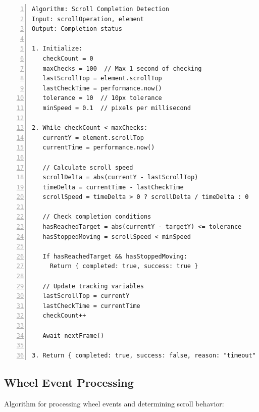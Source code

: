 \documentclass[10pt]{article}
\begin{document}
\begin{Verbatim}[frame=lines, numbers=left, tabsize=2, fontsize=\small, xleftmargin=1em, xrightmargin=1em, breaklines=true]
Algorithm: Scroll Completion Detection
Input: scrollOperation, element
Output: Completion status

1. Initialize:
   checkCount = 0
   maxChecks = 100  // Max 1 second of checking
   lastScrollTop = element.scrollTop
   lastCheckTime = performance.now()
   tolerance = 10  // 10px tolerance
   minSpeed = 0.1  // pixels per millisecond

2. While checkCount < maxChecks:
   currentY = element.scrollTop
   currentTime = performance.now()
   
   // Calculate scroll speed
   scrollDelta = abs(currentY - lastScrollTop)
   timeDelta = currentTime - lastCheckTime
   scrollSpeed = timeDelta > 0 ? scrollDelta / timeDelta : 0
   
   // Check completion conditions
   hasReachedTarget = abs(currentY - targetY) <= tolerance
   hasStoppedMoving = scrollSpeed < minSpeed
   
   If hasReachedTarget && hasStoppedMoving:
     Return { completed: true, success: true }
   
   // Update tracking variables
   lastScrollTop = currentY
   lastCheckTime = currentTime
   checkCount++
   
   Await nextFrame()

3. Return { completed: true, success: false, reason: "timeout" }
\end{Verbatim}

\subsection{Wheel Event Processing}

Algorithm for processing wheel events and determining scroll behavior:
\end{document}

